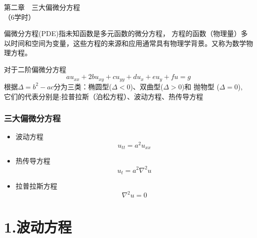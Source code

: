 	\begin{frame}
		\frametitle{}
	    \begin{center}
		{ {\Huge 第二章~~三大偏微分方程\\（6学时）}}
	    \end{center}    
	\end{frame}


\begin{frame}
	\begin{definition}[] 
	偏微分方程(PDE)指未知函数是多元函数的微分方程，
	方程的函数（物理量）多以时间和空间为变量，这些方程的来源和应用通常具有物理学背景。又称为数学物理方程。
	\end{definition}
	对于二阶偏微分方程
	\begin{equation*}
		au_{xx}+2bu_{xy}+cu_{yy}+du_x+eu_y+fu=g
	\end{equation*}
	根据$\Delta=b^2-ac$分为三类：椭圆型($\Delta<0$)、双曲型($\Delta>0$)和 抛物型 ($\Delta=0$),\\
	它们的代表分别是:拉普拉斯（泊松方程）、波动方程、热传导方程
\end{frame}

\begin{frame}
\frametitle{三大偏微分方程}
	\begin{itemize}
	\item  波动方程 
	\begin{equation*}
		u_{tt}=a^2u_{xx}
	\end{equation*}
	\item  热传导方程
	\begin{equation*}
		u_t=a^2 \nabla ^2 u 
	\end{equation*}
	\item  拉普拉斯方程
	\begin{equation*}
		 \nabla ^2 u =0
	\end{equation*}
	\end{itemize}
\end{frame}

\section{1.波动方程}
